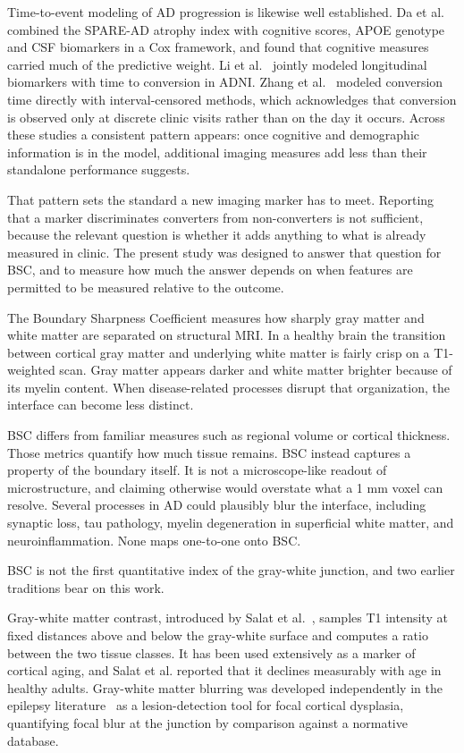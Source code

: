 \documentclass[blue]{ludusofficial}  %
\begin{document}
Time-to-event modeling of AD progression is likewise well established. Da et al.~\cite{da2014integration} combined the SPARE-AD atrophy index with cognitive scores, APOE genotype and CSF biomarkers in a Cox framework, and found that cognitive measures carried much of the predictive weight. Li et al.~\cite{li2017prediction} jointly modeled longitudinal biomarkers with time to conversion in ADNI. Zhang et al.~\cite{zhang2024interval} modeled conversion time directly with interval-censored methods, which acknowledges that conversion is observed only at discrete clinic visits rather than on the day it occurs. Across these studies a consistent pattern appears: once cognitive and demographic information is in the model, additional imaging measures add less than their standalone performance suggests.

That pattern sets the standard a new imaging marker has to meet. Reporting that a marker discriminates converters from non-converters is not sufficient, because the relevant question is whether it adds anything to what is already measured in clinic. The present study was designed to answer that question for BSC, and to measure how much the answer depends on when features are permitted to be measured relative to the outcome.

The Boundary Sharpness Coefficient measures how sharply gray matter and white matter are separated on structural MRI. In a healthy brain the transition between cortical gray matter and underlying white matter is fairly crisp on a T1-weighted scan. Gray matter appears darker and white matter brighter because of its myelin content. When disease-related processes disrupt that organization, the interface can become less distinct.

BSC differs from familiar measures such as regional volume or cortical thickness. Those metrics quantify how much tissue remains. BSC instead captures a property of the boundary itself. It is not a microscope-like readout of microstructure, and claiming otherwise would overstate what a 1 mm voxel can resolve. Several processes in AD could plausibly blur the interface, including synaptic loss, tau pathology, myelin degeneration in superficial white matter, and neuroinflammation. None maps one-to-one onto BSC.


BSC is not the first quantitative index of the gray-white junction, and two earlier traditions bear on this work.

Gray-white matter contrast, introduced by Salat et al.~\cite{salat2009age}, samples T1 intensity at fixed distances above and below the gray-white surface and computes a ratio between the two tissue classes. It has been used extensively as a marker of cortical aging, and Salat et al. reported that it declines measurably with age in healthy adults. Gray-white matter blurring was developed independently in the epilepsy literature~\cite{huppertz2005enhanced,blackmon2015cortical} as a lesion-detection tool for focal cortical dysplasia, quantifying focal blur at the junction by comparison against a normative database.
\end{document}
